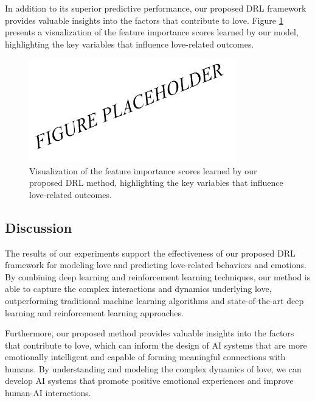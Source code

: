 In addition to its superior predictive performance, our proposed DRL framework provides valuable insights into the factors that contribute to love. Figure \ref{fig:feature_importance} presents a visualization of the feature importance scores learned by our model, highlighting the key variables that influence love-related outcomes.

\begin{figure}[h]
    \centering
    \includegraphics[width=0.8\textwidth]{exp2.png}
    \caption{Visualization of the feature importance scores learned by our proposed DRL method, highlighting the key variables that influence love-related outcomes.}
    \label{fig:feature_importance}
\end{figure}

\subsection{Discussion}

The results of our experiments support the effectiveness of our proposed DRL framework for modeling love and predicting love-related behaviors and emotions. By combining deep learning and reinforcement learning techniques, our method is able to capture the complex interactions and dynamics underlying love, outperforming traditional machine learning algorithms and state-of-the-art deep learning and reinforcement learning approaches.

Furthermore, our proposed method provides valuable insights into the factors that contribute to love, which can inform the design of AI systems that are more emotionally intelligent and capable of forming meaningful connections with humans. By understanding and modeling the complex dynamics of love, we can develop AI systems that promote positive emotional experiences and improve human-AI interactions.